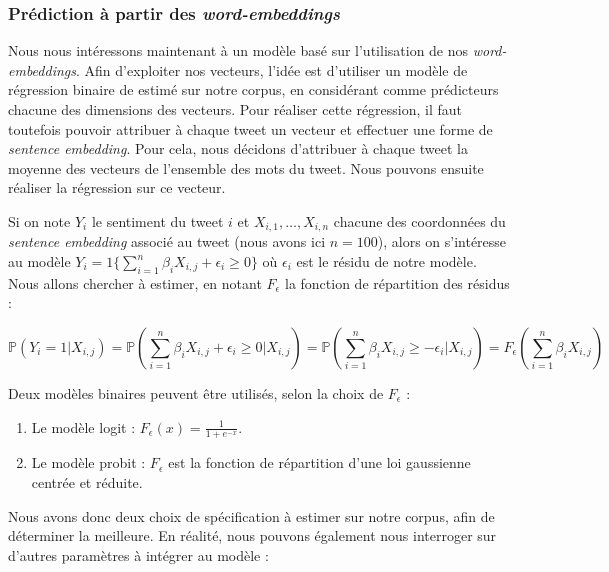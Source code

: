 \documentclass[11pt,french,french]{article}
\begin{document}
\subsubsection{\texorpdfstring{Prédiction à partir des
\emph{word-embeddings}}{Prédiction à partir des word-embeddings}}\label{pruxe9diction-uxe0-partir-des-word-embeddings}

Nous nous intéressons maintenant à un modèle basé sur l'utilisation de
nos \emph{word-embeddings}. Afin d'exploiter nos vecteurs, l'idée est
d'utiliser un modèle de régression binaire de estimé sur notre corpus,
en considérant comme prédicteurs chacune des dimensions des vecteurs.
Pour réaliser cette régression, il faut toutefois pouvoir attribuer à
chaque tweet un vecteur et effectuer une forme de \emph{sentence
embedding}. Pour cela, nous décidons d'attribuer à chaque tweet la
moyenne des vecteurs de l'ensemble des mots du tweet. Nous pouvons
ensuite réaliser la régression sur ce vecteur.

Si on note \(Y_i\) le sentiment du tweet \(i\) et
\(X_{i,1}, \dots, X_{i,n}\) chacune des coordonnées du \emph{sentence
embedding} associé au tweet (nous avons ici \(n=100\)), alors on
s'intéresse au modèle
\(Y_i = 1\{ \sum\limits_{i = 1}^n \beta_i X_{i,j} + \epsilon_i \geq 0 \}\)
où \(\epsilon_i\) est le résidu de notre modèle. Nous allons chercher à
estimer, en notant \(F_{\epsilon}\) la fonction de répartition des
résidus :

\begin{equation*}
\mathbb{P}(Y_i = 1 | X_{i,j}) = \mathbb{P}(\sum\limits_{i = 1}^n \beta_i X_{i,j} + \epsilon_i \geq 0 | X_{i,j})
= \mathbb{P}(\sum\limits_{i = 1}^n \beta_i X_{i,j}\geq - \epsilon_i  | X_{i,j}) = F_{\epsilon}(\sum\limits_{i = 1}^n \beta_i X_{i,j})
\end{equation*}

Deux modèles binaires peuvent être utilisés, selon la choix de
\(F_{\epsilon}\) :

\begin{enumerate}
\def\labelenumi{\arabic{enumi}.}
\item
  Le modèle logit : \(F_{\epsilon}(x) = \frac{1}{1 + e^{-x}}\).
\item
  Le modèle probit : \(F_{\epsilon}\) est la fonction de répartition
  d'une loi gaussienne centrée et réduite.
\end{enumerate}

Nous avons donc deux choix de spécification à estimer sur notre corpus,
afin de déterminer la meilleure. En réalité, nous pouvons également nous
interroger sur d'autres paramètres à intégrer au modèle :
\end{document}
